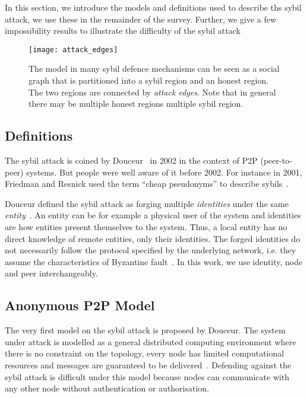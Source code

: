 In this section, we introduce the models and definitions used to describe ths
sybil attack, we use these in the remainder of the survey. Further, we give a
few impossibility results to illustrate the difficulty of the sybil attack

\begin{figure}
  \centering
  \texttt{[image: attack\_edges]}
  \caption{The model in many sybil defence mechanisms can be seen as a social
    graph that is partitioned into a sybil region and an honest region. The two
    regions are connected by \emph{attack edges}. Note that in general there may
    be multiple honest regions multiple sybil region. }
  \label{fig:attack-edge}
\end{figure}

\subsection{Definitions}
The sybil attack is coined by Douceur~\cite{douceur2002sybil} in 2002 in the
context of P2P (peer-to-peer) systems. But people were well aware of it before
2002. For instance in 2001, Friedman and Resnick used the term ``cheap
pseudonyms'' to describe sybils~\cite{resnick2001social}.

Douceur defined the sybil attack as forging multiple \emph{identities} under the
same \emph{entity}~\cite{douceur2002sybil}. An entity can be for example a
physical user of the system and identities are how entities present themselves
to the system. Thus, a local entity has no direct knowledge of remote entities,
only their identities. The forged identities do not necessarily follow the
protocol specified by the underlying network, i.e. they assume the
characteristics of Byzantine fault~\cite{lamport1982byzantine}. In this work, we
use identity, node and peer interchangeably.

\subsection{Anonymous P2P Model}
The very first model on the sybil attack is proposed by Douceur. The system
under attack is modelled as a general distributed computing environment where
there is no constraint on the topology, every node has limited computational
resources and messages are guaranteed to be delivered~\cite{douceur2002sybil}.
Defending against the sybil attack is difficult under this model because nodes
can communicate with any other node without authentication or authorisation.

